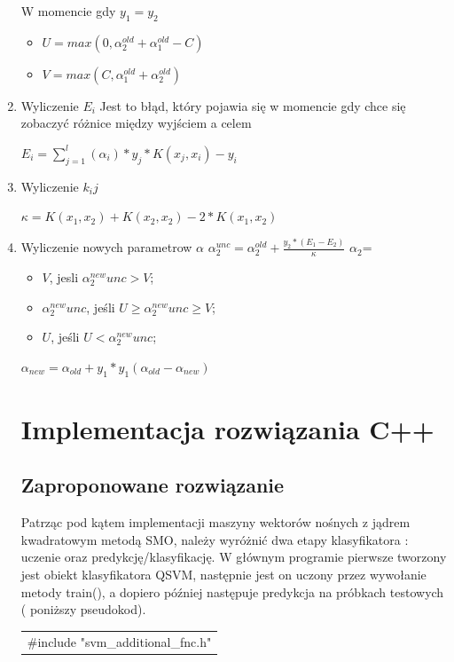 \documentclass[11pt]{article}
\begin{document}
\begin{enumerate}
 
W momencie gdy $y_{1}=y_{2}$
\begin{itemize}
\item$ U = max(0,\alpha_{2}^{old} + \alpha_{1}^{old} - C)$
 \item $ V = max(C, \alpha_{1}^{old} + \alpha_{2}^{old})$
 
\end{itemize}
\item Wyliczenie $E_i$ Jest to błąd, który pojawia się w momencie gdy chce się zobaczyć różnice między wyjściem a celem

$ E_i = \sum_{j=1}^{l}(\alpha_{i})*y_{j}*K(x_j,x_i)-y_i$

\item Wyliczenie $k_ij$

$\kappa = K(x_1,x_2) + K(x_2,x_2) - 2*K(x_1,x_2)$

\item Wyliczenie nowych parametrow $\alpha$ \newline
$\alpha_{2}^{unc} = \alpha_{2}^{old} + \frac{y_2*(E_1-E_2)}{\kappa}$
\newline
$\alpha_{2}$= 
\begin{itemize}
\item $V$, jesli $\alpha_{2}^{new}{unc}>V$;
\item $\alpha_{2}^{new}{unc}$, jeśli $U\ge\alpha_{2}^{new}{unc}\ge V$;
\item $U$, jeśli $U<\alpha_{2}^{new}{unc}$;
\newline
\end{itemize}
$\alpha_{new} = \alpha_{old} + y_{1}*y_{1}(\alpha_{old}-\alpha_{new})$
\newpage
\section{Implementacja rozwiązania C++}
\subsection{Zaproponowane rozwiązanie}
Patrząc pod kątem implementacji maszyny wektorów nośnych z jądrem kwadratowym metodą SMO, należy wyróżnić dwa etapy klasyfikatora : uczenie oraz predykcję/klasyfikację. W głównym programie pierwsze tworzony jest obiekt klasyfikatora QSVM, następnie jest on uczony przez wywołanie metody train(), a dopiero później następuje predykcja na próbkach testowych ( poniższy pseudokod).\\ 

\begin{tabular}{|p{11.5cm}|} \hline\noindent \#include "svm\_additional\_fnc.h"


\end{tabular}
\end{enumerate}
\end{document}
